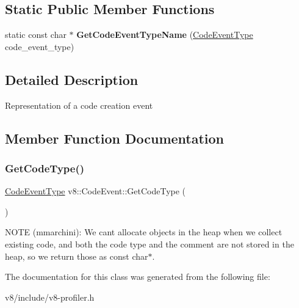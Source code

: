 \subsection*{Static Public Member Functions}
\begin{DoxyCompactItemize}
\item 
\mbox{\label{classv8_1_1CodeEvent_a9eb6284bf0b4031536f175f87a7b4cbf}} 
static const char $\ast$ {\bfseries Get\+Code\+Event\+Type\+Name} (\mbox{\hyperlink{namespacev8_af0ff31131cc32ced9b5279b321569bbc}{Code\+Event\+Type}} code\+\_\+event\+\_\+type)
\end{DoxyCompactItemize}


\subsection{Detailed Description}
Representation of a code creation event 

\subsection{Member Function Documentation}
\mbox{\label{classv8_1_1CodeEvent_a3a6507024df2e1e0898c03bc35bbd293}} 
\subsubsection{\texorpdfstring{Get\+Code\+Type()}{GetCodeType()}}
{\footnotesize\ttfamily \mbox{\hyperlink{namespacev8_af0ff31131cc32ced9b5279b321569bbc}{Code\+Event\+Type}} v8\+::\+Code\+Event\+::\+Get\+Code\+Type (\begin{DoxyParamCaption}{ }\end{DoxyParamCaption})}

N\+O\+TE (mmarchini)\+: We can\textquotesingle{}t allocate objects in the heap when we collect existing code, and both the code type and the comment are not stored in the heap, so we return those as const char$\ast$. 

The documentation for this class was generated from the following file\+:\begin{DoxyCompactItemize}
\item 
v8/include/v8-\/profiler.\+h\end{DoxyCompactItemize}
